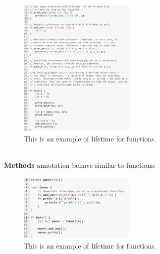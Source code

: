 \documentclass{article}
\begin{document}
\\
\\
\\
\\
\\
\\
\\
\begin{figure}[h]
  \centering
  \includegraphics[width=0.5\textwidth]{images/functions_lifetime_annotation.png} 
  \caption{This is an example of lifetime for functions.}
  \label{fig:explicit_annotation_example}
\end{figure}
\\
\textbf{Methods} annotation behave similar to functions:
\\
\begin{figure}[h]
  \centering
  \includegraphics[width=0.5\textwidth]{images/methods_lifetime.png} 
  \caption{This is an example of lifetime for functions.}
  \label{fig:explicit_annotation_example}
\end{figure}
\end{document}
